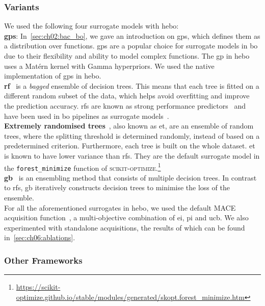 \subsubsection{ Variants}
\label{sec:ch06:surrogates}
We used the following four surrogate models with \gls{hebo}:\\
\textbf{\Glspl{gp}}: In~\cref{sec:ch02:bac_bo}, we gave an introduction on \glspl{gp}, which defines them as a distribution over functions. \glspl{gp} are a popular choice for surrogate models in \gls{bo} due to their flexibility and ability to model complex functions.
    The \gls{gp} in \gls{hebo} uses a Matérn kernel with Gamma hyperpriors. We used the native implementation of \glspl{gp} in \gls{hebo}.\\
    \textbf{\Gls{rf}}~\citep{Breiman01} is a \emph{bagged} ensemble of decision trees. This means that each tree is fitted on a different random subset of the data, which helps avoid overfitting and improve the prediction accuracy. \glspl{rf} are known as strong performance predictors~\citep{HutEtAl14} and have been used in \gls{bo} pipelines as surrogate models~\citep{HutEtAl11}.\\
    \textbf{Extremely randomised trees}~\citep{GeuEtAl06}, also known as \gls{et}, are an ensemble of random trees, where the splitting threshold is determined randomly, instead of based on a predetermined criterion. Furthermore, each tree is built on the whole dataset. \gls{et} is known to have lower variance than \glspl{rf}. They are the default surrogate model in the \texttt{forest\_minimize} function of \textsc{scikit-optimize}.\footnote{\url{https://scikit-optimize.github.io/stable/modules/generated/skopt.forest_minimize.htm}}\\
    \textbf{\Gls{gb}}~\citep{Friedman01} is an ensembling method that consists of multiple decision trees. In contrast to \glspl{rf}, \gls{gb} iteratively constructs decision trees to minimise the loss of the ensemble.\\
    For all the aforementioned surrogates in \gls{hebo}, we used the default MACE acquisition function~\citep{LyuEtAl18}, a multi-objective combination of \gls{ei}, \gls{pi} and \gls{ucb}.
    We also experimented with standalone acquisitions, the results of which can be found in~\cref{sec:ch06:ablations}.

\subsubsection{Other  Frameworks}


